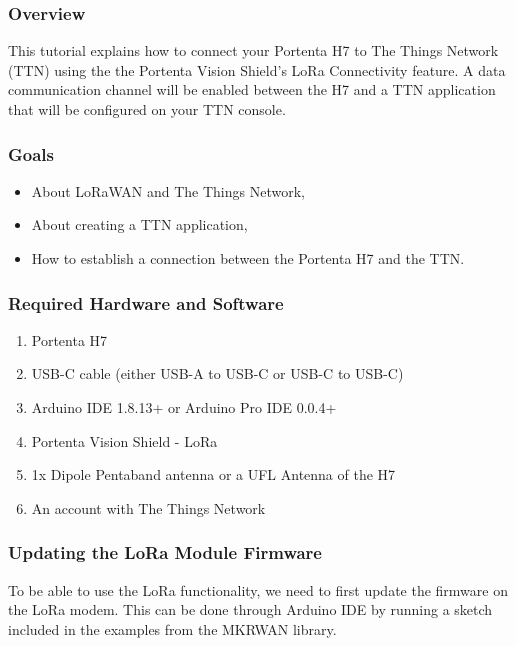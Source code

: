 \subsubsection{Overview}
This tutorial explains how to connect your Portenta H7 to The Things Network (TTN) using the the Portenta Vision Shield's LoRa Connectivity feature. A data communication channel will be enabled between the H7 and a TTN application that will be configured on your TTN console. \cite{connecting_to_ttn_portenta_vision_shield:2024}

\subsubsection{Goals}
\begin{itemize}
	\item About LoRaWAN and The Things Network,
	\item About creating a TTN application, 
	\item How to establish a connection between the Portenta H7 and the TTN. \cite{connecting_to_ttn_portenta_vision_shield:2024}
\end{itemize}

\subsubsection {Required Hardware and Software}
\begin{enumerate}
	\item Portenta H7
	\item USB-C cable (either USB-A to USB-C or USB-C to USB-C)
	\item Arduino IDE 1.8.13+ or Arduino Pro IDE 0.0.4+
	\item Portenta Vision Shield - LoRa
	\item 1x Dipole Pentaband antenna or a UFL Antenna of the H7 
	\item An account with The Things Network \cite{connecting_to_ttn_portenta_vision_shield:2024}
\end{enumerate}

\subsubsection {Updating the LoRa Module Firmware}
To be able to use the LoRa functionality, we need to first update the firmware on the LoRa modem. This can be done through Arduino IDE by running a sketch included in the examples from the MKRWAN library.

